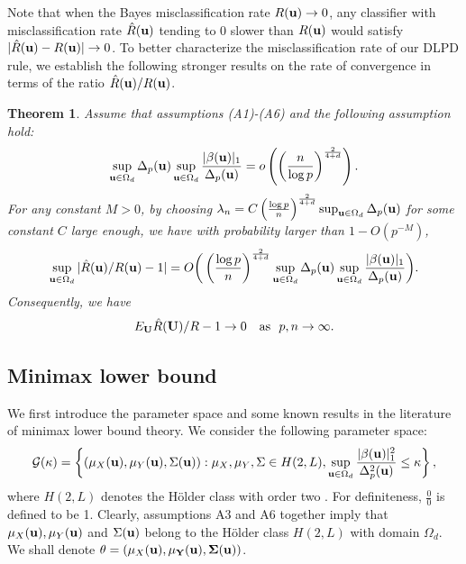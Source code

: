 \documentclass[11pt]{article}
\newtheorem{thm}{Theorem}%
\theoremstyle{definition}
\begin{document}
 Note that when the Bayes misclassification rate $R({\bf u})\rightarrow 0$, any classifier with misclassification rate $\hat{R}({\bf u})$ tending to $0$ slower than $R({\bf u})$ would satisfy $|\hat{R}({\bf u})-R({\bf u})|\rightarrow 0$. To better characterize the misclassification rate of our DLPD rule, we establish the following stronger results on the rate of convergence in terms of the ratio $\hat{R}({\bf u})/R({\bf u})$.
 
 
 \begin{thm}\label{theorem2}
 	Assume that assumptions (A1)-(A6)
 	and the following assumption hold:
 	\begin{eqnarray}\label{assump2}
 		\sup_{{\bf u}\in \Omega_d}\Delta_p({\bf u})\sup_{{\bf u}\in \Omega_d}\frac{ |\beta({\bf u})|_1}{\Delta_p({\bf u})}=o\left(\left(\frac{n}{\log p}\right)^{\frac{2}{4+d}}\right).
 	\end{eqnarray}
 	For any constant $M>0$, by choosing $\lambda_n=C\left(\frac{\log p}{n}\right)^{\frac{2}{4+d}}\sup_{{\bf u}\in \Omega_d}{\Delta_p({\bf u})}$ for some constant $C$
 	large enough, we have with probability larger than $1-{O}(p^{-M})$,
 	\begin{eqnarray*}
 		\sup_{{\bf u}\in \Omega_d}|\hat{R}({\bf u})/R({\bf u})-1|=
 		O\bigg(\left(\frac{\log p}{n}\right)^{\frac{2}{4+d}}\sup_{{\bf u}\in \Omega_d}\Delta_p({\bf u})\sup_{{\bf u}\in \Omega_d}  \frac{|\beta({\bf u})|_1}{\Delta_p({\bf u})}\bigg).
 	\end{eqnarray*}
 	Consequently, we have
 	\begin{eqnarray*}
 		E_{\bf U}\hat{R}({\bf U})/R-1\rightarrow 0  ~~~{\rm as} ~~p, n\rightarrow \infty.
 	\end{eqnarray*}
 \end{thm}
 
 
 \subsection{Minimax lower bound}
 We first introduce the parameter space and some known results in the literature of minimax lower bound theory.  %
 We consider the following parameter space:
 \[
 {\cal G}(\kappa)=\left\{(\mu_X({\bf u}),\mu_Y({\bf u}), \Sigma({\bf u})): \mu_X,\mu_Y,\Sigma\in H(2,L),\sup_{{\bf u}\in \Omega_d}\frac{ |\beta({\bf u})|_1^2}{\Delta_p^2({\bf u})}\leq \kappa \right\},
 \]
 where $H(2,L)$ denotes the H\"{o}lder class with order two \citep{Tsybakov}. For definiteness, $\frac{0}{0}$ is defined to be 1. Clearly, assumptions A3 and A6 together imply that $\mu_X({\bf u}),\mu_Y({\bf u})$ and $\Sigma({\bf u})$ belong to the H\"{o}lder class $H(2,L)$ with domain $\Omega_d$. We shall denote $\theta=(\mu_X(\bf u),\mu_Y(\bf u),\Sigma(\bf u))$.
 
\end{document}
